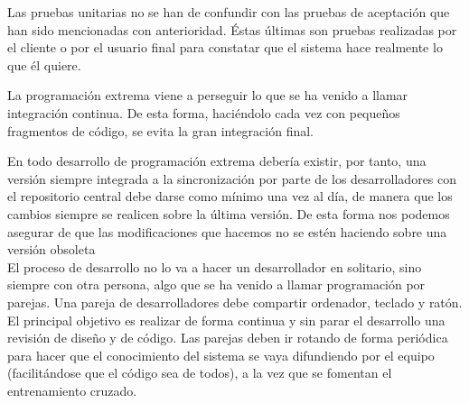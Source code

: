 \documentclass[12pt]{book} %
\begin{document}
			Las pruebas unitarias no se han de confundir con las pruebas de aceptación que han sido mencionadas con anterioridad. Éstas
			últimas son pruebas realizadas por el cliente o por el usuario final para constatar que el sistema hace realmente lo que él
			quiere.
			 
			La programación extrema viene a perseguir lo que se ha venido a llamar integración continua. De esta forma, haciéndolo cada vez
			con pequeños fragmentos de código, se evita la gran integración final. 
			
			En todo desarrollo de programación extrema debería existir, por tanto, una versión siempre integrada a la sincronización por
			parte de los desarrolladores con el repositorio central debe darse como mínimo una vez al día, de manera que los cambios siempre
			se realicen sobre la última versión. De esta forma nos podemos asegurar de que las modificaciones que hacemos no se estén
			haciendo sobre una  versión obsoleta\\
			
			El proceso de desarrollo no lo va a hacer un desarrollador en solitario, sino siempre con otra persona, algo que se ha venido a 
			llamar programación por parejas. Una pareja de desarrolladores debe compartir ordenador, teclado y ratón. El principal objetivo 
			es realizar de forma continua y sin parar el desarrollo una revisión de diseño y de código. Las parejas deben ir rotando de
			forma periódica para hacer que el conocimiento del sistema se vaya difundiendo por el equipo (facilitándose que el código sea 
			de todos), a la vez que se fomentan el entrenamiento cruzado.
			
\end{document}
